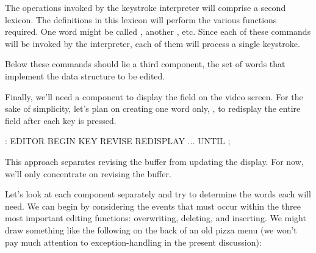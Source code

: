 The operations invoked by the keystroke interpreter will comprise a
second lexicon. The definitions in this lexicon will perform the
various functions required. One word might be called , another
, etc. Since each of these commands will be invoked by the
interpreter, each of them will process a single keystroke.

Below these commands should lie a third component, the set of
words that implement the data structure to be edited.


Finally, we'll need a component to display the field on the video
screen. For the sake of simplicity, let's plan on creating one word only,
, to redisplay the entire field after each key is pressed.

\begin{Code}
: EDITOR  BEGIN  KEY  REVISE  REDISPLAY  ... UNTIL ;
\end{Code}
This approach separates revising the buffer from updating the display.
For now, we'll only concentrate on revising the buffer.

Let's look at each component separately and try to determine the words
each will need. We can begin by considering the events that must occur
within the three most important editing functions: overwriting,
deleting, and inserting. We might draw something like the following on
the back of an old pizza menu (we won't pay much attention to
exception-handling in the present discussion):

